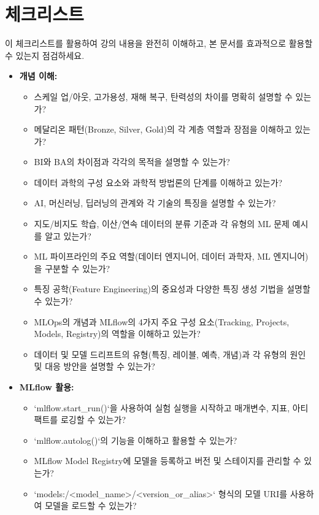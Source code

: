\documentclass[11pt,a4paper]{article}
\begin{document}
\newpage
\section*{체크리스트}

\begin{tcolorbox}[summarybox={학습 및 문서 작성 점검표}]
이 체크리스트를 활용하여 강의 내용을 완전히 이해하고, 본 문서를 효과적으로 활용할 수 있는지 점검하세요.

\begin{itemize}
    \item \textbf{개념 이해:}
    \begin{itemize}
        \item 스케일 업/아웃, 고가용성, 재해 복구, 탄력성의 차이를 명확히 설명할 수 있는가?
        \item 메달리온 패턴(Bronze, Silver, Gold)의 각 계층 역할과 장점을 이해하고 있는가?
        \item BI와 BA의 차이점과 각각의 목적을 설명할 수 있는가?
        \item 데이터 과학의 구성 요소와 과학적 방법론의 단계를 이해하고 있는가?
        \item AI, 머신러닝, 딥러닝의 관계와 각 기술의 특징을 설명할 수 있는가?
        \item 지도/비지도 학습, 이산/연속 데이터의 분류 기준과 각 유형의 ML 문제 예시를 알고 있는가?
        \item ML 파이프라인의 주요 역할(데이터 엔지니어, 데이터 과학자, ML 엔지니어)을 구분할 수 있는가?
        \item 특징 공학(Feature Engineering)의 중요성과 다양한 특징 생성 기법을 설명할 수 있는가?
        \item MLOps의 개념과 MLflow의 4가지 주요 구성 요소(Tracking, Projects, Models, Registry)의 역할을 이해하고 있는가?
        \item 데이터 및 모델 드리프트의 유형(특징, 레이블, 예측, 개념)과 각 유형의 원인 및 대응 방안을 설명할 수 있는가?
    \end{itemize}
    \item \textbf{MLflow 활용:}
    \begin{itemize}
        \item `mlflow.start_run()`을 사용하여 실험 실행을 시작하고 매개변수, 지표, 아티팩트를 로깅할 수 있는가?
        \item `mlflow.autolog()`의 기능을 이해하고 활용할 수 있는가?
        \item MLflow Model Registry에 모델을 등록하고 버전 및 스테이지를 관리할 수 있는가?
        \item `models:/<model_name>/<version_or_alias>` 형식의 모델 URI를 사용하여 모델을 로드할 수 있는가?

\end{itemize}
\end{itemize}
\end{tcolorbox}
\end{document}
